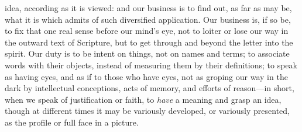 idea, according as it is viewed: and our business is to find out, as
far as may be, what it is which admits of such diversified
application. Our business is, if so be, to fix that one real sense
before our mind's eye, not to loiter or lose our way in the outward
text of Scripture, but to get through and beyond the letter into the
spirit. Our duty is to be intent on things, not on names and terms; to
associate words with their objects, instead of measuring them by their
definitions; to speak as having eyes, and as if to those who have
eyes, not as groping our way in the dark by intellectual conceptions,
acts of memory, and efforts of reason—in short, when we speak of
justification or faith, to \emph{have} a meaning and grasp an idea,
though at different times it may be variously developed, or variously
presented, as the profile or full face in a picture.

